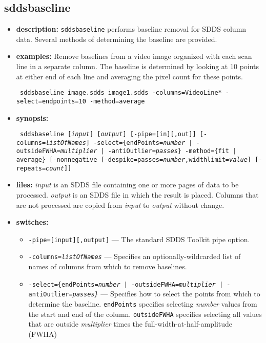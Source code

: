 \newpage
\subsection{sddsbaseline}
\label{sddsbaseline}

\begin{itemize}
\item {\bf description:}
\verb|sddsbaseline| performs baseline removal for SDDS column data.  Several methods of
determining the baseline are provided.
\item {\bf examples:}
Remove baselines from a video image organized with each scan line in a separate column.
The baseline is determined by looking at 10 points at either end of each line and averaging
the pixel count for these points.
\begin{flushleft}{\tt
sddsbaseline image.sdds image1.sdds -columns=VideoLine* -select=endpoints=10 -method=average 
}\end{flushleft}
\item {\bf synopsis:} 
\begin{flushleft}{\tt
sddsbaseline [{\em input}] [{\em output}] [-pipe=[in][,out]]
[-columns={\em listOfNames}]
-select=\{endPoints={\em number} | -outsideFWHA={\em multiplier} | -antiOutlier={\em passes}\}
-method=\{fit | average\}
[-nonnegative [-despike=passes={\em number},widthlimit={\em value}] [-repeats={\em count}]]
}\end{flushleft}
\item {\bf files:}
{\em input} is an SDDS file containing one or more pages of data to be processed.
{\em output} is an SDDS file in which the result is placed.  Columns that are not
processed are copied from {\em input} to {\em output} without change.
\item {\bf switches:}
    \begin{itemize}
    \item {\tt -pipe=[input][,output]} --- The standard SDDS Toolkit pipe option.
    \item {\tt -columns={\em listOfNames}} --- Specifies an optionally-wildcarded list
        of names of columns from which to remove baselines.
    \item {\tt -select=\{endPoints={\em number} | -outsideFWHA={\em multiplier} | -antiOutlier={\em passes\}}} --- Specifies how to select the points from which to determine the baseline.  \verb|endPoints| specifies selecting {\em number} values from the start and end of the column.  \verb|outsideFWHA| specifies selecting all values that are outside {\em multiplier} times the full-width-at-half-amplitude (FWHA) 

\end{itemize}
\end{itemize}
